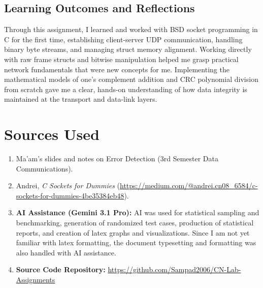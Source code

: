 \documentclass[12pt,a4paper]{article}
\begin{document}
\subsection{Learning Outcomes and Reflections}
Through this assignment, I learned and worked with BSD socket programming in C for the first time, establishing client-server UDP communication, handling binary byte streams, and managing struct memory alignment. Working directly with raw frame structs and bitwise manipulation helped me grasp practical network fundamentals that were new concepts for me. Implementing the mathematical models of one's complement addition and CRC polynomial division from scratch gave me a clear, hands-on understanding of how data integrity is maintained at the transport and data-link layers.



\section{Sources Used}
\begin{enumerate}[leftmargin=*]
    \item Ma'am's slides and notes on Error Detection (3rd Semester Data Communications).
    \item Andrei, \textit{C Sockets for Dummies} (\url{https://medium.com/@andrei.cn08_6584/c-sockets-for-dummies-4be35384eb48}).
    \item \textbf{AI Assistance (Gemini 3.1 Pro):} AI was used for statistical sampling and benchmarking, generation of randomized test cases, production of statistical reports, and creation of latex graphs and visualizations. Since I am not yet familiar with latex formatting, the document typesetting and formatting was also handled with AI assistance.
    \item \textbf{Source Code Repository:} \url{https://github.com/Sampad2006/CN-Lab-Assignments}
\end{enumerate}
\end{document}
